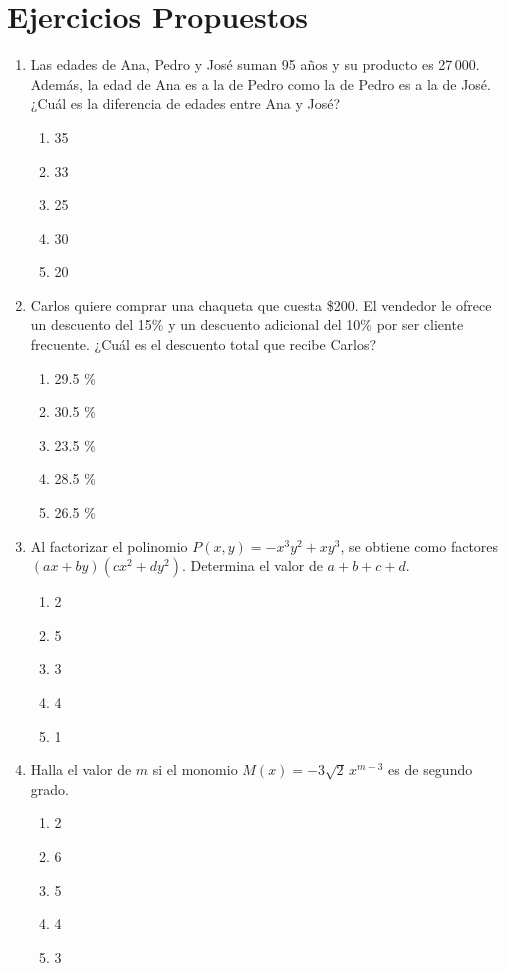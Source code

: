 \newpage


\section*{Ejercicios Propuestos}


\begin{enumerate}
	
	\item Las edades de Ana, Pedro y José suman 95 años y su producto es 27\,000. Además, la edad de Ana es a la de Pedro como la de Pedro es a la de José. ¿Cuál es la diferencia de edades entre Ana y José?
	\begin{enumerate}[label=\alph*)]
		\item 35
		\item 33
		\item 25
		\item 30
		\item 20
	\end{enumerate}
	
	\item Carlos quiere comprar una chaqueta que cuesta \$200. El vendedor le ofrece un descuento del 15\% y un descuento adicional del 10\% por ser cliente frecuente. ¿Cuál es el descuento total que recibe Carlos?
	\begin{enumerate}[label=\alph*)]
		\item 29.5 \%
		\item 30.5 \%
		\item 23.5 \%
		\item 28.5 \%
		\item 26.5 \%
	\end{enumerate}
	
	\item Al factorizar el polinomio $P(x,y)=-x^3y^2+xy^3$, se obtiene como factores $(ax+by)(cx^2+dy^2)$. Determina el valor de $a+b+c+d$.
	\begin{enumerate}[label=\alph*)]
		\item 2
		\item 5
		\item 3
		\item 4
		\item 1
	\end{enumerate}
	
	\item Halla el valor de $m$ si el monomio $M(x)=-3\sqrt{2}\,x^{m-3}$ es de segundo grado.
	\begin{enumerate}[label=\alph*)]
		\item 2
		\item 6
		\item 5
		\item 4
		\item 3
	\end{enumerate}
	

\end{enumerate}
